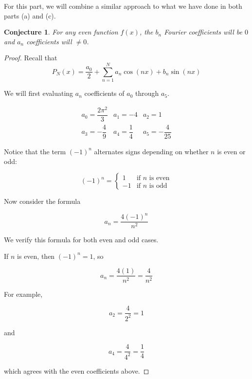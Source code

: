 \documentclass[12pt]{article}
\newtheorem{conj}{Conjecture}
\begin{document}
\begin{enumerate}[label=(\alph*)]
\vspace{.1in}
For this part, we will combine a similar approach to what we have done in both parts (a) and (c).
\begin{conj}
    For any even function $f(x)$, the $b_n$ Fourier coefficients will be $0$ and $a_n$ coefficients will $\neq 0$.
\end{conj}

\begin{proof}
    Recall that 
    \[P_N(x) = \dfrac{a_0}{2} + \sum_{n=1}^{N}a_n\cos({nx}) + b_n\sin({nx})\]

    We will first  evaluating $a_n$ coefficients of $a_0$ through $a_5$.

    \[
    \begin{array}{lll}
      a_0 = \dfrac{2\pi^2}{3} & a_1 = -4 & a_2 = 1 \\
      a_3 = -\dfrac{4}{9} & a_4 = \dfrac{1}{4} & a_5 = -\dfrac{4}{25}
    \end{array}
    \]

    Notice that the term $(-1)^n$ alternates signs depending on whether
    $n$ is even or odd:
    
    \[(-1)^n =
    \begin{cases}
    1 & \text{if $n$ is even} \\
    -1 & \text{if $n$ is odd}
    \end{cases}
    \]
    
    \vspace{.1in}
    
    Now consider the formula
    
    \[a_n = \frac{4(-1)^n}{n^2}\]
    
    We verify this formula for both even and odd cases.
    
    \vspace{.1in}
    
    If $n$ is even, then $(-1)^n = 1$, so
    
    \[ a_n = \frac{4(1)}{n^2} = \frac{4}{n^2}\]
    
    For example,
    
    \[a_2 = \frac{4}{2^2} = 1\]
    
    and
    
    \[
    a_4
    =
    \frac{4}{4^2}
    =
    \frac14
    \]
    
    which agrees with the even coefficients above.
    
    \vspace{.1in}
    

\end{proof}
\end{enumerate}
\end{document}
